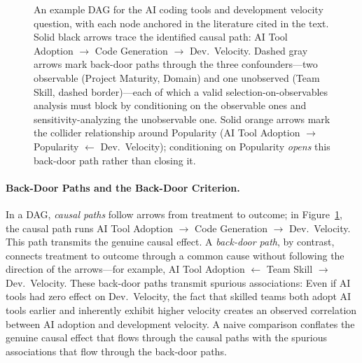 \begin{figure}[t]
\caption{An example DAG for the AI coding tools and development velocity question, with each node anchored in the literature cited in the text.
Solid black arrows trace the identified causal path: AI Tool Adoption $\to$ Code Generation $\to$ Dev.\ Velocity.
Dashed gray arrows mark back-door paths through the three confounders---two observable (Project Maturity, Domain) and one unobserved (Team Skill, dashed border)---each of which a valid selection-on-observables analysis must block by conditioning on the observable ones and sensitivity-analyzing the unobservable one.
Solid orange arrows mark the collider relationship around Popularity (AI Tool Adoption $\to$ Popularity $\leftarrow$ Dev.\ Velocity); conditioning on Popularity \emph{opens} this back-door path rather than closing it.}
\label{fig:ai-dag}
\end{figure}

\paragraph{Back-Door Paths and the Back-Door Criterion.}
In a DAG, \emph{causal paths} follow arrows from treatment to outcome; in Figure~\ref{fig:ai-dag}, the causal path runs AI Tool Adoption $\to$ Code Generation $\to$ Dev.\ Velocity.
This path transmits the genuine causal effect.
A \emph{back-door path}, by contrast, connects treatment to outcome through a common cause without following the direction of the arrows---for example, AI Tool Adoption $\leftarrow$ Team Skill $\rightarrow$ Dev.\ Velocity.
These back-door paths transmit spurious associations: Even if AI tools had zero effect on Dev.\ Velocity, the fact that skilled teams both adopt AI tools earlier and inherently exhibit higher velocity creates an observed correlation between AI adoption and development velocity.
A naive comparison conflates the genuine causal effect that flows through the causal paths with the spurious associations that flow through the back-door paths.

